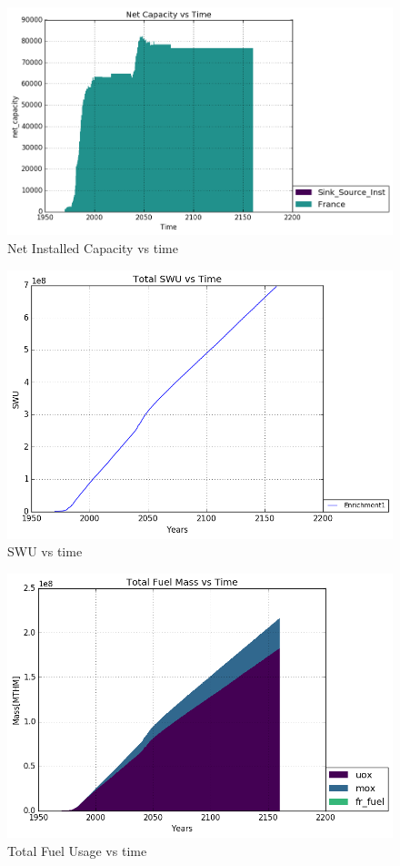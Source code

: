\begin{figure}
	\includegraphics[width=\linewidth]{./images/reprocess/power_plot.png}
	\caption{Net Installed Capacity vs time}
	\label{fig:reprocess_capacity}
\end{figure}

\begin{figure}
	\includegraphics[width=\linewidth]{./images/reprocess/Enrichment1_SWU.png}
	\caption{SWU vs time}
	\label{fig:reprocess_swu}
\end{figure}

\begin{figure}
	\includegraphics[width=\linewidth]{./images/reprocess/total_fuel.png}
	\caption{Total Fuel Usage vs time}
	\label{fig:reprocess_fuel}
\end{figure}

